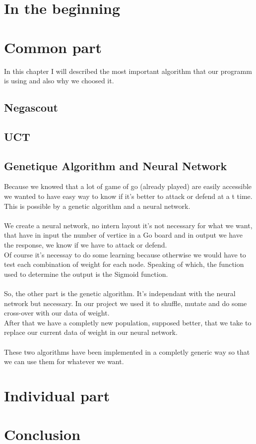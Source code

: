 \documentclass[10pt, a4paper] {report}
\begin{document}
\author{}
\title{}
\date{}

\maketitle{}
\tableofcontents
{} \setcounter{page}{2}


\chapter{In the beginning}

\chapter{Common part}
In this chapter I will described the most important algorithm that our programm
is using and also why we choosed it.\\

\section{Negascout}

\section{UCT}

\section{Genetique Algorithm and Neural Network}
Because we knowed that a lot of game of go (already played) are easily
accessible we wanted to have easy way to know if it's better to attack or defend
at a t time. This is possible by a genetic algorithm and a neural network.\\
\\
We create a neural network, no intern layout it's not necessary for what we
want, that have in input the number of vertice in a Go board and in output we
have the response, we know if we have to attack or defend.\\
Of course it's necessay to do some learning because otherwise we would have to
test each combination of weight for each node. Speaking of which, the function
used to determine the output is the Sigmoid function.\\
\\
So, the other part is the genetic algorithm. It's independant with the
neural network but necessary. In our project we used it to shuffle, mutate and
do some cross-over with our data of weight.\\
After that we have a completly new population, supposed better, that we take to
replace our current data of weight in our neural network.\\
\\
These two algorithms have been implemented in a completly generic way so that we
can use them for whatever we want.\\

\chapter{Individual part}

\chapter{Conclusion}
\end{document}
